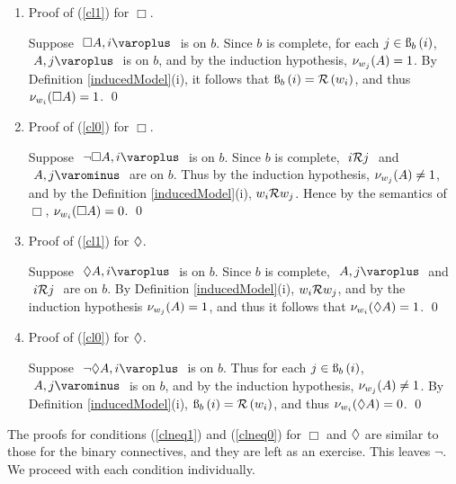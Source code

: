 \begin{proof*}
\begin{enumerate}
	\setcounter{enumi}{\value{enumi_saved}}
	
	\item Proof of (\ref{cl1}) for $ \Box $.
	
			Suppose $ \like{ \dNodei{ \Box A } } $ is on $ b $.
			Since $ b $ is complete, for each $ j \in \text{\ss}_{b}\left({i}\right) $, $ \like{ \dNodej{ A } } $ is on $ b $, 
			and by the induction hypothesis, $ \mathcal{\nu}_{ w_j }({ A }) = 1 $. 
			By Definition \ref{inducedModel}(i), it follows that $ \text{\ss}_{b}\left({ i }\right) = \mathcal{R}\left({ w_i }\right)$, and thus $ \mathcal{\nu}_{ w_i }({ \Box A }) = 1 $.
			\qed

	\item Proof of (\ref{cl0}) for $ \Box $.
	
			Suppose $ \like{ \dNodei{ \neg \Box A }} $ is on $ b $. 
			Since $ b $ is complete, $ \ {  {i} \mathcal{R} {j}  }\  $ and $ \like{ \uNodej{A} } $ are on $b$.
			Thus by the induction hypothesis, $ \mathcal{\nu}_{ w_j }({A}) \neq 1 $, and by the Definition \ref{inducedModel}(i), $  { w_i } \mathcal{R} { w_j } $.
			Hence by the semantics of $ \Box $, $ \mathcal{\nu}_{ w_i }({ \Box A }) = 0 $.
			\qed
			

	\item Proof of (\ref{cl1}) for $ \Diamond $.
	
			Suppose $ \like{ \dNodei{ \Diam A }} $ is on $ b $.
			Since $ b $ is complete, $ \like{ \dNodej{ A }} $ and $ \ {  { i } \mathcal{R} { j }  }\  $ are on $ b $. 
			By Definition \ref{inducedModel}(i), $  { w_i } \mathcal{R} { w_j }  $, and by the induction hypothesis $ \mathcal{\nu}_{ w_j }({ A }) = 1 $,
			and thus it follows that $ \mathcal{\nu}_{ w_i }({ \Diamond A }) = 1 $.
			\qed

	\item Proof of (\ref{cl0}) for $ \Diamond $.
	
			Suppose $ \like{ \dNodei{ \neg \Diam A }} $ is on $ b $.
			Thus for each $ j \in \text{\ss}_{b}\left({i}\right) $, $ \like{ \uNodej{ A }} $ is on $ b $,
			and by the induction hypothesis, $ \mathcal{\nu}_{ w_j }({ A }) \neq 1 $.
			By Definition \ref{inducedModel}(i), $ \text{\ss}_{b}\left({ i }\right) = \mathcal{R}\left({ w_i }\right) $, and thus $ \mathcal{\nu}_{ w_i }({ \Diamond A }) = 0 $.
			\qed

	\setcounter{enumi_saved}{\value{enumi}}
\end{enumerate}
The proofs for conditions (\ref{clneq1}) and (\ref{clneq0}) for $ \Box $ and $ \Diamond $ are similar to those for the binary connectives, and they are left as an exercise. This leaves $ \neg $. We proceed with each condition individually.

\pagebreak


\end{proof*}
